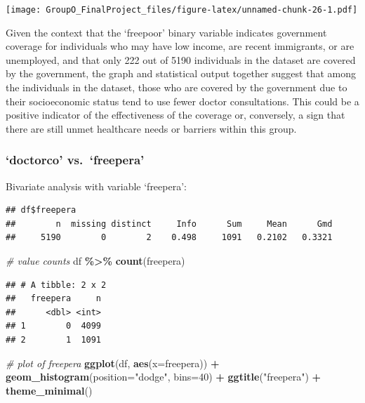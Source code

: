 \documentclass[
]{article}
\newenvironment{Shaded}{\begin{snugshade}}{\end{snugshade}}
\newcommand{\AttributeTok}[1]{\textcolor[rgb]{0.13,0.29,0.53}{#1}}
\newcommand{\CommentTok}[1]{\textcolor[rgb]{0.56,0.35,0.01}{\textit{#1}}}
\newcommand{\DecValTok}[1]{\textcolor[rgb]{0.00,0.00,0.81}{#1}}
\newcommand{\FunctionTok}[1]{\textcolor[rgb]{0.13,0.29,0.53}{\textbf{#1}}}
\newcommand{\NormalTok}[1]{#1}
\newcommand{\SpecialCharTok}[1]{\textcolor[rgb]{0.81,0.36,0.00}{\textbf{#1}}}
\newcommand{\StringTok}[1]{\textcolor[rgb]{0.31,0.60,0.02}{#1}}
\begin{document}
\texttt{[image: GroupO\_FinalProject\_files/figure-latex/unnamed-chunk-26-1.pdf]}

Given the context that the `freepoor' binary variable indicates
government coverage for individuals who may have low income, are recent
immigrants, or are unemployed, and that only 222 out of 5190 individuals
in the dataset are covered by the government, the graph and statistical
output together suggest that among the individuals in the dataset, those
who are covered by the government due to their socioeconomic status tend
to use fewer doctor consultations. This could be a positive indicator of
the effectiveness of the coverage or, conversely, a sign that there are
still unmet healthcare needs or barriers within this group.

\subsubsection{`doctorco' vs.~`freepera'}\label{doctorco-vs.-freepera}

Bivariate analysis with variable `freepera':

\begin{Shaded}
\end{Shaded}

\begin{verbatim}
## df$freepera 
##        n  missing distinct     Info      Sum     Mean      Gmd 
##     5190        0        2    0.498     1091   0.2102   0.3321
\end{verbatim}

\begin{Shaded}
\begin{Highlighting}[]
\CommentTok{\# value counts}
\NormalTok{df }\SpecialCharTok{\%\textgreater{}\%} \FunctionTok{count}\NormalTok{(freepera)}
\end{Highlighting}
\end{Shaded}

\begin{verbatim}
## # A tibble: 2 x 2
##   freepera     n
##      <dbl> <int>
## 1        0  4099
## 2        1  1091
\end{verbatim}

\begin{Shaded}
\begin{Highlighting}[]
\CommentTok{\# plot of freepera}
\FunctionTok{ggplot}\NormalTok{(df, }\FunctionTok{aes}\NormalTok{(}\AttributeTok{x=}\NormalTok{freepera)) }\SpecialCharTok{+}
  \FunctionTok{geom\_histogram}\NormalTok{(}\AttributeTok{position=}\StringTok{"dodge"}\NormalTok{, }\AttributeTok{bins=}\DecValTok{40}\NormalTok{) }\SpecialCharTok{+}
  \FunctionTok{ggtitle}\NormalTok{(}\StringTok{"freepera"}\NormalTok{) }\SpecialCharTok{+}
  \FunctionTok{theme\_minimal}\NormalTok{()}
\end{Highlighting}
\end{Shaded}
\end{document}
